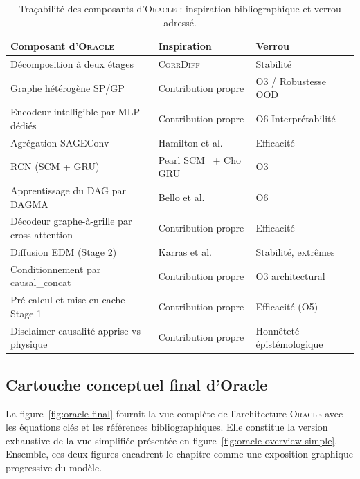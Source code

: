 \documentclass[14pt,a4paper,openany]{extreport}
\theoremstyle{definition}
\newcommand{\Oracle}{\textsc{Oracle}}
\newcommand{\CorrDiff}{\textsc{CorrDiff}}
\begin{document}
\begin{table}[ht]
  \centering
  \small
  \caption{Traçabilité des composants d'\Oracle{} : inspiration bibliographique et verrou adressé.}
  \label{tab:tracabilite}
  \begin{tabularx}{\linewidth}{l X l}
    \toprule
    \textbf{Composant d'\Oracle{}} & \textbf{Inspiration} & \textbf{Verrou} \\
    \midrule
    Décomposition à deux étages & \CorrDiff{}~\cite{mardani_corrdiff_2023} & Stabilité\\
    Graphe hétérogène SP/GP & Contribution propre & O3 / Robustesse OOD\\
    Encodeur intelligible par MLP dédiés & Contribution propre & O6 Interprétabilité\\
    Agrégation SAGEConv & Hamilton et al.~\cite{hamilton_sage_2017} & Efficacité\\
    RCN (SCM + GRU) & Pearl SCM~\cite{pearl_causality_2009} + Cho GRU~\cite{cho_gru_2014} & O3\\
    Apprentissage du DAG par DAGMA & Bello et al.~\cite{bello_dagma_2022} & O6\\
    Décodeur graphe-à-grille par cross-attention & Contribution propre & Efficacité\\
    Diffusion EDM (Stage 2) & Karras et al.~\cite{karras_edm_2022} & Stabilité, extrêmes\\
    Conditionnement par causal\_concat & Contribution propre & O3 architectural\\
    Pré-calcul et mise en cache Stage 1 & Contribution propre & Efficacité (O5)\\
    Disclaimer causalité apprise vs physique & Contribution propre & Honnêteté épistémologique\\
    \bottomrule
  \end{tabularx}
\end{table}

\subsection{Cartouche conceptuel final d'Oracle}
\label{ssec:oracle-cartouche-final}

La figure~\ref{fig:oracle-final} fournit la vue complète de l'architecture \Oracle{} avec les équations clés et les références bibliographiques. Elle constitue la version exhaustive de la vue simplifiée présentée en figure~\ref{fig:oracle-overview-simple}. Ensemble, ces deux figures encadrent le chapitre comme une exposition graphique progressive du modèle.
\end{document}
